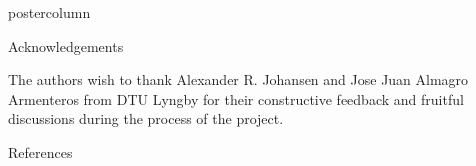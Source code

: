 \documentclass[final,hyperref={pdfpagelabels=false}]{beamer}
\begin{document}
\begin{frame}
\begin{columns}
\begin{column}{.49\paperwidth}
\begin{beamercolorbox}[center,wd=\textwidth]{postercolumn}
\begin{minipage}[T]{.99\textwidth}
{%
%
%
%
%
%
%
%
%
%
%
\begin{block}{Acknowledgements}
\centering
\begin{minipage}[t]{0.98\textwidth}

\footnotesize{The authors wish to thank Alexander R. Johansen and Jose Juan Almagro Armenteros from DTU Lyngby for their constructive feedback and fruitful discussions during the process of the project.}
\end{minipage}
\end{block}
\vfill

\begin{block}{References}

{\scriptsize
	

}			
\end{block}
\vfill


}
\end{minipage}
\end{beamercolorbox}
\end{column}
\end{columns}
\end{frame}
\end{document}
